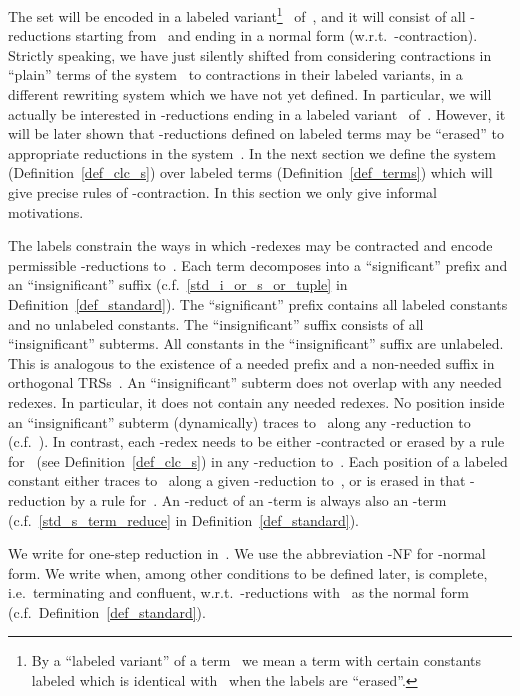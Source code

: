 \documentclass[a4paper,UKenglish]{lipics-v2016}
\begin{document}
The set  will be encoded in a labeled
variant\footnote{By a ``labeled variant'' of a term~ we mean a term
  with certain constants labeled which is identical with~ when the
  labels are ``erased''.}~ of~, and it will consist of all
-reductions starting from~ and ending in a normal form
(w.r.t.~-contraction). Strictly speaking, we have just silently
shifted from considering contractions in ``plain'' terms of the
system~ to contractions in their labeled variants, in a
different rewriting system which we have not yet defined. In
particular, we will actually be interested in -reductions ending in
a labeled variant~ of~. However, it will be later shown
that -reductions defined on labeled terms may be ``erased'' to
appropriate reductions in the system~. In the next section we
define the system~ (Definition~\ref{def_clc_s}) over labeled
terms (Definition~\ref{def_terms}) which will give precise rules of
-contraction. In this section we only give informal motivations.

The labels constrain the ways in which -redexes may be contracted
and encode permissible -reductions to~. Each term decomposes
into a ``significant'' prefix and an ``insignificant'' suffix
(c.f.~\ref{std_i_or_s_or_tuple} in Definition~\ref{def_standard}). The
``significant'' prefix contains all labeled constants and no unlabeled
constants. The ``insignificant'' suffix consists of all
``insignificant'' subterms. All constants in the ``insignificant''
suffix are unlabeled. This is analogous to the existence of a needed
prefix and a non-needed suffix in orthogonal
TRSs~\cite[Section~9.2.2]{Terese2003}. An ``insignificant'' subterm
does not overlap with any needed redexes. In particular, it does not
contain any needed redexes. No position inside an ``insignificant''
subterm (dynamically) traces to~ along any -reduction
to~ (c.f.~\cite[Definition~8.6.7]{Terese2003}). In contrast,
each -redex needs to be either -contracted or erased by a rule
for~ (see Definition~\ref{def_clc_s}) in any -reduction
to~. Each position of a labeled constant either traces
to~ along a given -reduction to~, or is erased in
that -reduction by a rule for~. An -reduct of an -term
is always also an -term (c.f.~\ref{std_s_term_reduce} in
Definition~\ref{def_standard}).

We write  for one-step reduction in~. We use the
abbreviation -NF for -normal form. We write 
when, among other conditions to be defined later,  is complete,
i.e.~terminating and confluent, w.r.t.~-reductions with~ as
the normal form (c.f.~Definition~\ref{def_standard}).
\end{document}
